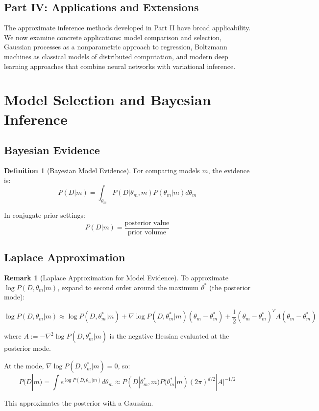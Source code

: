 \documentclass[12pt,a4paper]{article}
\theoremstyle{definition}
\newtheorem{definition}{Definition}[section]
\newtheorem{remark}{Remark}[section]
\begin{document}
\newpage
\vspace*{2cm}
\begin{center}
    \section*{\Large Part IV: Applications and Extensions}
\end{center}
\vspace*{1cm}
\nobreak

The approximate inference methods developed in Part II have broad applicability. We now examine concrete applications: model comparison and selection, Gaussian processes as a nonparametric approach to regression, Boltzmann machines as classical models of distributed computation, and modern deep learning approaches that combine neural networks with variational inference.

\newpage

\section{Model Selection and Bayesian Inference}

\subsection{Bayesian Evidence}

\begin{definition}[Bayesian Model Evidence]
For comparing models $m$, the evidence is:
\[
P(D | m) = \int_{\theta_m} P(D | \theta_m, m) P(\theta_m | m) d\theta_m
\]

In conjugate prior settings:
\[
P(D | m) = \frac{\text{posterior value}}{\text{prior volume}}
\]
\end{definition}

\subsection{Laplace Approximation}

\begin{remark}[Laplace Approximation for Model Evidence]
To approximate $\log P(D, \theta_m | m)$, expand to second order around the maximum $\theta^*$ (the posterior mode):

\[
\log P(D, \theta_m | m) \approx \log P(D, \theta_m^* | m) + \nabla \log P(D, \theta_m^* | m)(\theta_m - \theta_m^*) + \frac{1}{2}(\theta_m - \theta_m^*)^T A (\theta_m - \theta_m^*)
\]

where $A := -\nabla^2 \log P(D, \theta_m^* | m)$ is the negative Hessian evaluated at the posterior mode.

At the mode, $\nabla \log P(D, \theta_m^* | m) = 0$, so:
\[
P(D | m) = \int e^{\log P(D, \theta_m | m)} d\theta_m \approx P(D | \theta_m^*, m) P(\theta_m^* | m) (2\pi)^{d/2} |A|^{-1/2}
\]

This approximates the posterior with a Gaussian.
\end{remark}
\end{document}
